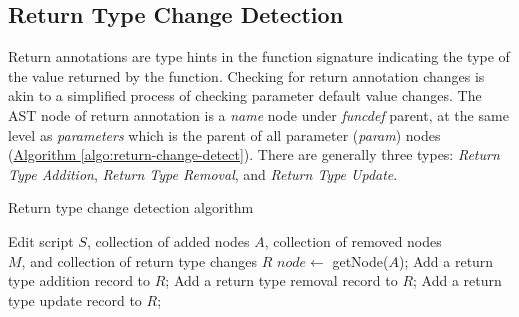 \subsection{Return Type Change Detection}

Return annotations are type hints in the function signature indicating the type of the value returned by the function. Checking for return annotation changes is akin to a simplified process of checking parameter default value changes. The AST node of return annotation is a \textit{name} node under \textit{funcdef} parent, at the same level as \textit{parameters} which is the parent of all parameter (\textit{param}) nodes (\hyperref[algo:return-change-detect]{Algorithm \ref*{algo:return-change-detect}}). There are generally three types: \textit{Return Type Addition}, \textit{Return Type Removal}, and \textit{Return Type Update}.

\begin{algorithm}
	\caption{Return type change detection algorithm}
	\label{algo:return-change-detect}
	\begin{algorithmic}[1]
		\REQUIRE Edit script $S$, collection of added nodes $A$, collection of removed nodes \\
		$M$, and collection of return type changes $R$
			\STATE $node \gets$ getNode($A$);
					\STATE Add a return type addition record to $R$;
					\STATE Add a return type removal record to $R$;
					\STATE Add a return type update record to $R$;
				\ENDIF
			\ENDIF
		\ENDFOR
	\end{algorithmic}
\end{algorithm}
